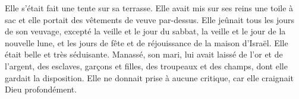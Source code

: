 Elle s'était fait une tente sur sa terrasse.
Elle avait mis sur ses reins une toile à sac
	et elle portait des vêtements de veuve par-dessus.
Elle jeûnait tous les jours de son veuvage, excepté la veille et le jour du sabbat,
	la veille et le jour de la nouvelle lune,
	et les jours de fête et de réjouissance de la maison d'Israël.
Elle était belle et très séduisante.
Manassé, son mari, lui avait laissé de l'or et de l'argent,
	des esclaves, garçons et filles, des troupeaux et des champs,
	dont elle gardait la disposition.
Elle ne donnait prise à aucune critique, car elle craignait Dieu profondément.
